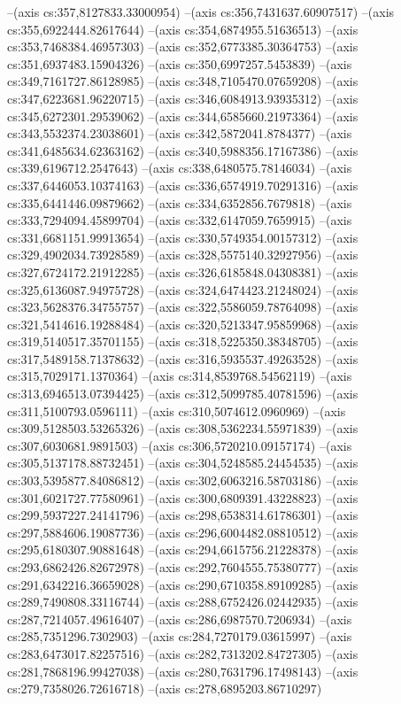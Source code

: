 --(axis cs:357,8127833.33000954)
--(axis cs:356,7431637.60907517)
--(axis cs:355,6922444.82617644)
--(axis cs:354,6874955.51636513)
--(axis cs:353,7468384.46957303)
--(axis cs:352,6773385.30364753)
--(axis cs:351,6937483.15904326)
--(axis cs:350,6997257.5453839)
--(axis cs:349,7161727.86128985)
--(axis cs:348,7105470.07659208)
--(axis cs:347,6223681.96220715)
--(axis cs:346,6084913.93935312)
--(axis cs:345,6272301.29539062)
--(axis cs:344,6585660.21973364)
--(axis cs:343,5532374.23038601)
--(axis cs:342,5872041.8784377)
--(axis cs:341,6485634.62363162)
--(axis cs:340,5988356.17167386)
--(axis cs:339,6196712.2547643)
--(axis cs:338,6480575.78146034)
--(axis cs:337,6446053.10374163)
--(axis cs:336,6574919.70291316)
--(axis cs:335,6441446.09879662)
--(axis cs:334,6352856.7679818)
--(axis cs:333,7294094.45899704)
--(axis cs:332,6147059.7659915)
--(axis cs:331,6681151.99913654)
--(axis cs:330,5749354.00157312)
--(axis cs:329,4902034.73928589)
--(axis cs:328,5575140.32927956)
--(axis cs:327,6724172.21912285)
--(axis cs:326,6185848.04308381)
--(axis cs:325,6136087.94975728)
--(axis cs:324,6474423.21248024)
--(axis cs:323,5628376.34755757)
--(axis cs:322,5586059.78764098)
--(axis cs:321,5414616.19288484)
--(axis cs:320,5213347.95859968)
--(axis cs:319,5140517.35701155)
--(axis cs:318,5225350.38348705)
--(axis cs:317,5489158.71378632)
--(axis cs:316,5935537.49263528)
--(axis cs:315,7029171.1370364)
--(axis cs:314,8539768.54562119)
--(axis cs:313,6946513.07394425)
--(axis cs:312,5099785.40781596)
--(axis cs:311,5100793.0596111)
--(axis cs:310,5074612.0960969)
--(axis cs:309,5128503.53265326)
--(axis cs:308,5362234.55971839)
--(axis cs:307,6030681.9891503)
--(axis cs:306,5720210.09157174)
--(axis cs:305,5137178.88732451)
--(axis cs:304,5248585.24454535)
--(axis cs:303,5395877.84086812)
--(axis cs:302,6063216.58703186)
--(axis cs:301,6021727.77580961)
--(axis cs:300,6809391.43228823)
--(axis cs:299,5937227.24141796)
--(axis cs:298,6538314.61786301)
--(axis cs:297,5884606.19087736)
--(axis cs:296,6004482.08810512)
--(axis cs:295,6180307.90881648)
--(axis cs:294,6615756.21228378)
--(axis cs:293,6862426.82672978)
--(axis cs:292,7604555.75380777)
--(axis cs:291,6342216.36659028)
--(axis cs:290,6710358.89109285)
--(axis cs:289,7490808.33116744)
--(axis cs:288,6752426.02442935)
--(axis cs:287,7214057.49616407)
--(axis cs:286,6987570.7206934)
--(axis cs:285,7351296.7302903)
--(axis cs:284,7270179.03615997)
--(axis cs:283,6473017.82257516)
--(axis cs:282,7313202.84727305)
--(axis cs:281,7868196.99427038)
--(axis cs:280,7631796.17498143)
--(axis cs:279,7358026.72616718)
--(axis cs:278,6895203.86710297)
